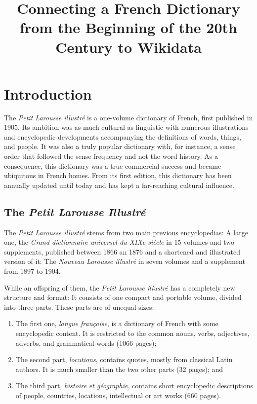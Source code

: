 \documentclass[10pt, a4paper]{article}
\title{Connecting a French Dictionary from the Beginning of the 20th Century to Wikidata}
\begin{document}
\maketitleabstract

\section{Introduction}
The \textit{Petit Larousse illustré} is a one-volume dictionary of French, first published in 1905. Its ambition was as much cultural as linguistic with numerous illustrations and encyclopedic developments accompanying the definitions of words, things, and people. It was also a truly popular dictionary with, for instance, a sense order that followed the sense frequency and not the word history. As a consequence, this dictionary was a true commercial success and became ubiquitous in French homes. From its first edition, this dictionary has been annually updated until today and has kept a far-reaching cultural influence.

\subsection{The \textit{Petit Larousse Illustré}}
The \textit{Petit Larousse illustré} stems from two main previous encyclopedias: A large one, the \textit{Grand dictionnaire universel du XIXe siècle} in 15 volumes and two supplements, published between 1866 an 1876 and a shortened and illustrated version of it: The \textit{Nouveau Larousse illustré} in seven volumes and a supplement from 1897 to 1904. 

While an offspring of them, the \textit{Petit Larousse illustré} has a completely new structure and format: It consists of one compact and portable volume, divided into three parts. These parts are of unequal sizes: 
\begin{enumerate}
    \item The first one, \textit{langue française}, is a   dictionary of French with some encyclopedic content. It is restricted to the common nouns, verbs, adjectives, adverbs, and grammatical words (1066 pages); 
    \item The second part, \textit{locutions}, contains quotes, mostly from classical Latin authors. It is much smaller than the two other parts (32 pages); and
    \item The third part, \textit{histoire et géographie}, contains short encyclopedic descriptions of people, countries, locations, intellectual or art works (660 pages).
\end{enumerate}
\end{document}
